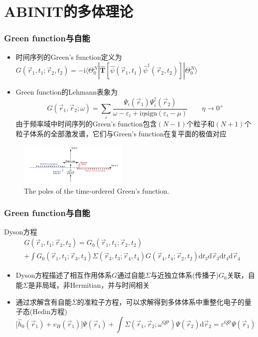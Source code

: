 \documentclass[cjk,slidestop,compress,mathserif,blue]{beamer}
\begin{document}
\section{ABINIT的多体理论}
\frame
{
	\frametitle{\textrm{Green function}与自能}
	\begin{itemize}
		\item 时间序列的\textrm{Green's function}定义为$G(\vec r_1,t_1;\vec r_2,t_2)=-\mathrm{i}\langle\Theta_0^N|\hat{\mathbf{T}}[\hat\psi(\vec r_1,t_1)\hat\psi^{\dag}(\vec r_2,t_2)]|\Theta_0^N\rangle$
		\item \textrm{Green function}的\textrm{Lehmann}表象为$$G(\vec r_1,\vec r_2;\omega)=\sum\limits_i\dfrac{\Psi_i(\vec r_1)\Psi_i^{\dag}(\vec r_2)}{\omega-\varepsilon_i+\mathrm{i}\eta\mathrm{sign}(\varepsilon_i-\mu)}\qquad\eta\rightarrow0^+$$
			由于频率域中时间序列的\textrm{Green's function}包含$(N-1)$个粒子和$(N+1)$个粒子体系的全部激发谱，它们与\textrm{Green's function}在复平面的极值对应
	\end{itemize}
\begin{figure}[h!]
\centering
\vspace{-5pt}
\includegraphics[height=0.80in,width=2.05in,viewport=30 1 660 265,clip]{Figures/GW-0.png}
\caption{\textrm{\small{The poles of the time-ordered Green's function.}}}%
\label{GW-0}
\end{figure}
}

\frame
{
	\frametitle{\textrm{Green function}与自能}
	\textrm{Dyson}方程
	\begin{displaymath}
		\begin{aligned}
	&G(\vec r_1,t_1;\vec r_2,t_2)=G_0(\vec r_1,t_1;\vec r_2,t_2)\\
	&+\int G_0(\vec r_1,t_1;\vec r_3,t_3)\Sigma(\vec r_3,t_3;\vec r_4,t_4)G(\vec r_4,t_4;\vec r_2,t_2)\mathrm{d}t_3\mathrm{d}\vec r_3\mathrm{d}t_4\mathrm{d}\vec r_4
		\end{aligned}
	\end{displaymath}
	\begin{itemize}
		\item \textrm{Dyson}方程描述了相互作用体系$G$通过自能$\Sigma$与近独立体系(传播子)$G_0$关联，自能$\Sigma$是非局域，非\textrm{Hermitian}，并与时间相关
		\item 通过求解含有自能$\Sigma$的准粒子方程，可以求解得到多体体系中重整化电子的量子态(\textrm{Hedin}方程)
			$$\bigg[\hat h_0(\vec r_1)+v_H(\vec r_1)\bigg]\Psi(\vec r_1)+\int\Sigma(\vec r_1,\vec r_2;\omega^{\mathrm{QP}})\Psi(\vec r_2)\mathrm{d}\vec r_2=\varepsilon^{\mathrm{QP}}\Psi(\vec r_1)$$
	\end{itemize}
}
\end{document}
